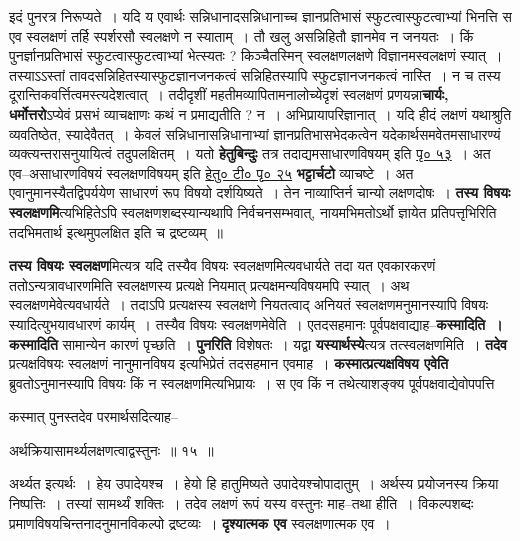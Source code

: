 \documentclass[article,12pt,a4paper]{memoir}
\begin{document}
	  \pstart इदं पुनरत्र निरूप्यते । यदि य एवार्थः सन्निधानादसन्निधानाच्च ज्ञानप्रतिभासं स्फुटत्वास्फुटत्वाभ्यां भिनत्ति स एव स्वलक्षणं तर्हि स्पर्शरसौ स्वलक्षणे न स्याताम् । तौ खलु असन्निहितौ ज्ञानमेव न जनयतः । किं पुनर्ज्ञानप्रतिभासं स्फुटत्वास्फुटत्वाभ्यां भेत्स्यतः ? किञ्चैतस्मिन् स्वलक्षणलक्षणे विज्ञानमस्वलक्षणं स्यात् । तस्याऽऽस्तां तावदसन्निहितस्यास्फुटज्ञानजनकत्वं सन्निहितस्यापि स्फुटज्ञानजनकत्वं नास्ति । न च तस्य दूरान्तिकवर्त्तित्वमस्त्यदेशत्वात् । तदीदृशीं महतीमव्यापितामनालोच्येदृशं स्वलक्षणं प्रणयन्ना\textbf{चार्यः, धर्मोत्तरो}ऽप्येवं प्रसभं व्याचक्षाणः कथं न प्रमाद्यतीति ? न । अभिप्रायापरिज्ञानात् । यदि हीदं लक्षणं यथाश्रुति व्यवतिष्ठेत, स्यादेवैतत् । केवलं सन्निधानासन्निधानाभ्यां ज्ञानप्रतिभासभेदकत्वेन यदेकार्थसमवेतमसाधारण्यं व्यक्त्यन्तरासनुयायित्वं तदुपलक्षितम् । यतो \textbf{हेतुबिन्दुः} तत्र तदाद्यमसाधारणविषयम् इति \href{http://sarit.indology.info/?cref=hbṭ.1.28}{पृ० ५३} । अत एव--असाधारणविषयं स्वलक्षणविषयम् इति \href{http://sarit.indology.info/?cref=hbṭ.1.14}{हेतु० टी० पृ० २५} \textbf{भट्टार्चटो} व्याचष्टे । अत एवानुमानस्यैतद्विपर्ययेण साधारणं रूप विषयो दर्शयिष्यते । तेन नाव्याप्तिर्न चान्यो लक्षणदोषः । \textbf{तस्य विषयः स्वलक्षणमि}त्यभिहितेऽपि स्वलक्षणशब्दस्यान्यथापि निर्वचनसम्भवात्, नायमभिमतोऽर्थो ज्ञायेत प्रतिपत्तृभिरिति तदभिमतार्थ इत्थमुपलक्षित इति च द्रष्टव्यम् ॥
	\pend
      

	  \pstart \textbf{तस्य विषयः स्वलक्षण}मित्यत्र यदि तस्यैव विषयः स्वलक्षणमित्यवधार्यते तदा यत एवकारकरणं ततोऽन्यत्रावधारणमिति स्वलक्षणस्य प्रत्यक्षे नियमात् प्रत्यक्षमन्यविषयमपि स्यात् । अथ स्वलक्षणमेवेत्यवधार्यते । तदाऽपि प्रत्यक्षस्य स्वलक्षणे नियतत्वाद् \leavevmode{} अनियतं स्वलक्षणमनुमानस्यापि विषयः स्यादित्युभयावधारणं कार्यम् । तस्यैव विषयः स्वलक्षणमेवेति । एतदसहमानः पूर्वपक्षवाद्याह--\textbf{कस्मादिति । कस्मादिति} सामान्येन कारणं पृच्छति । \textbf{पुनरिति} विशेषतः । यद्वा \textbf{यस्यार्थस्ये}त्यत्र तत्स्वलक्षणमिति । \textbf{तदेव} प्रत्यक्षविषयः स्वलक्षणं नानुमानविषय इत्यभिप्रेतं तदसहमान एवमाह । \textbf{कस्मात्प्रत्यक्षविषय एवेति} ब्रुवतोऽनुमानस्यापि विषयः किं न स्वलक्षणमित्यभिप्रायः । स एव किं न तथेत्याशङ्क्य पूर्वपक्षवाद्येवोपपत्ति  \leavevmode{} 
	  
	कस्मात् पुनस्तदेव परमार्थसदित्याह--  
	  
	अर्थक्रियासामर्थ्यलक्षणत्वाद्वस्तुनः ॥ १५ ॥ 
	  
	अर्थ्यत इत्यर्थः । हेय उपादेयश्च । हेयो हि हातुमिष्यते उपादेयश्चोपादातुम् । अर्थस्य प्रयोजनस्य क्रिया निष्पत्तिः । तस्यां सामर्थ्यं शक्तिः । तदेव लक्षणं रूपं यस्य वस्तुनः माह--तथा हीति । विकल्पशब्दः प्रमाणविषयचिन्तनादनुमानविकल्पो द्रष्टव्यः । \textbf{दृश्यात्मक एव} स्वलक्षणात्मक एव ।
	\pend
      
\end{document}
